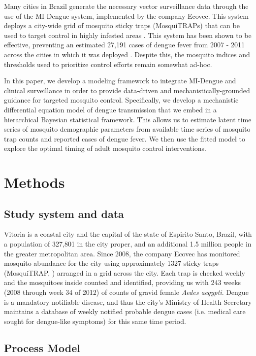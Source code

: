 \documentclass[10pt,letterpaper]{article}
\begin{document}
Many cities in Brazil generate the necessary vector surveillance data through the use of the MI-Dengue system, implemented by the company Ecovec.
This system deploys a city-wide grid of mosquito sticky traps (MosquiTRAPs) that can be used to target control in highly infested areas \cite{Eiras2009}.
This system has been shown to be effective, preventing an estimated 27,191 cases of dengue fever from 2007 - 2011 across the cities in which it was deployed \cite{Pepin2013}.
Despite this, the mosquito indices and thresholds used to prioritize control efforts remain somewhat ad-hoc.

In this paper, we develop a modeling framework to integrate MI-Dengue and clinical surveillance in order to provide data-driven and mechanistically-grounded guidance for targeted mosquito control.
Specifically, we develop a mechanistic differential equation model of dengue transmission that we embed in a hierarchical Bayesian statistical framework.
This allows us to estimate latent time series of mosquito demographic parameters from available time series of mosquito trap counts and reported cases of dengue fever.
We then use the fitted model to explore the optimal timing of adult mosquito control interventions.

\section*{Methods}

\subsection*{Study system and data}

Vitoria is a coastal city and the capital of the state of Espirito Santo, Brazil, with a population of 327,801 in the city proper, and an additional 1.5 million people in the greater metropolitan area.  
Since 2008, the company Ecovec has monitored mosquito abundance for the city using approximately 1327 sticky traps (MosquiTRAP, \cite{Eiras2009}) arranged in a grid across the city.
Each trap is checked weekly and the mosquitoes inside counted and identified, providing us with 243 weeks (2008 through week 34 of 2012) of counts of gravid female \emph{Aedes aegypti}.
Dengue is a mandatory notifiable disease, and thus the city's Ministry of Health Secretary maintains a database of weekly notified probable dengue cases (i.e. medical care sought for dengue-like symptoms) for this same time period.

\subsection*{Process Model}
\end{document}
